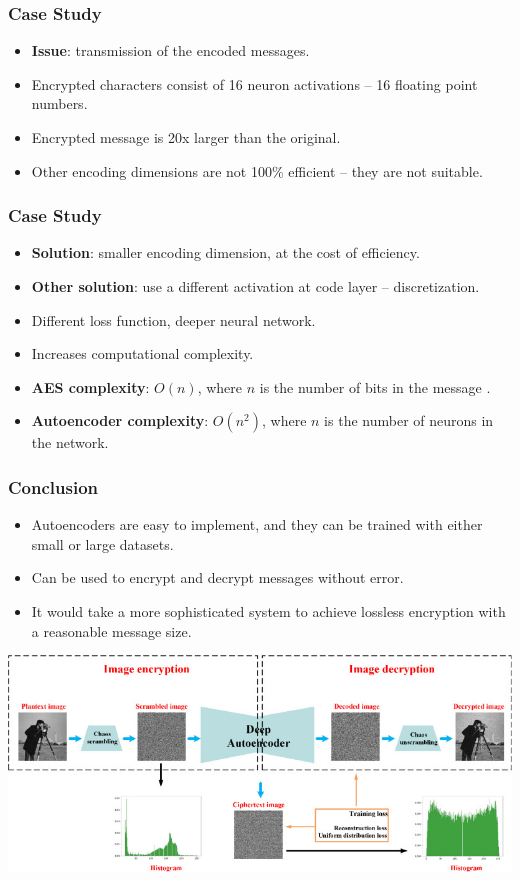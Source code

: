 \documentclass{beamer}
\begin{document}
\begin{frame}
    \frametitle{Case Study}
    \begin{itemize}
        \item \textbf{Issue}: transmission of the encoded messages.
        \item Encrypted characters consist of 16 neuron activations -- 16 floating point numbers.
        \item Encrypted message is 20x larger than the original.
        \item Other encoding dimensions are not 100\% efficient -- they are not suitable.
    \end{itemize}
\end{frame}

\begin{frame}
    \frametitle{Case Study}
    \begin{itemize}
        \item \textbf{Solution}: smaller encoding dimension, at the cost of efficiency.
        \item \textbf{Other solution}: use a different activation at code layer -- discretization.
        \item Different loss function, deeper neural network.
        \item Increases computational complexity.
        \item \textbf{AES complexity}: $O(n)$, where $n$ is the number of bits in the message \cite{aes}.
        \item \textbf{Autoencoder complexity}: $O(n^2)$, where $n$ is the number of neurons in the network.
    \end{itemize}
\end{frame}

\begin{frame}
    \frametitle{Conclusion}
    \begin{itemize}
        \item Autoencoders are easy to implement, and they can be trained with either small or large datasets.
        \item Can be used to encrypt and decrypt messages without error.
        \item It would take a more sophisticated system to achieve lossless encryption with a reasonable message size.
    \end{itemize}
    \centering
    \includegraphics[width=\textwidth]{img/autoencoder_image.jpg}
\end{frame}

\appendix
\printbibliography
\end{document}
